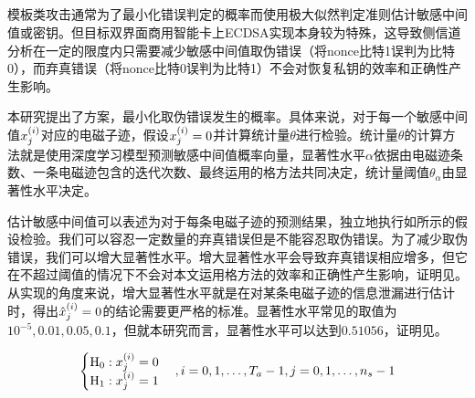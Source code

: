 {{	\subsection{\jiashejianyanguji}

	模板类攻击通常为了最小化错误判定的概率而使用极大似然判定准则估计敏感中间值或密钥。但目标双界面商用智能卡上ECDSA实现本身较为特殊，这导致侧信道分析在一定的限度内只需要减少敏感中间值取伪错误（将nonce比特1误判为比特0），而弃真错误（将nonce比特0误判为比特1）不会对恢复私钥的效率和正确性产生影响。
	
	本研究提出了\jiashejianyanguji 方案，最小化取伪错误发生的概率。具体来说，对于每一个敏感中间值$x^{(i)}_j$对应的电磁子迹，假设$x^{(i)}_j=0$并计算统计量$\theta$进行检验。统计量$\theta$的计算方法就是使用深度学习模型预测敏感中间值概率向量，显著性水平$\alpha$依据由电磁迹条数、一条电磁迹包含的迭代次数、最终运用的格方法共同决定，统计量阈值$\theta_{\alpha}$由显著性水平决定。
	
	
	估计敏感中间值可以表述为对于每条电磁子迹的预测结果，独立地执行如所示的假设检验。我们可以容忍一定数量的弃真错误但是不能容忍取伪错误。为了减少取伪错误，我们可以增大显著性水平。增大显著性水平会导致弃真错误相应增多，但它在不超过阈值的情况下不会对本文运用格方法的效率和正确性产生影响，证明见。从实现的角度来说，增大显著性水平就是在对某条电磁子迹的信息泄漏进行估计时，得出$\hat{x}^{(i)}_j=0$的结论需要更严格的标准。显著性水平常见的取值为$10^{-5},0.01,0.05,0.1$，但就本研究而言，显著性水平可以达到$0.51056$，证明见。
	
	\begin{equation}
		\begin{cases}
			\mathrm H_0:x^{(i)}_j=0\\
			\mathrm H_{1}:x^{(i)}_j=1
		\end{cases},i=0,1,\dots,T_a-1,j=0,1,\dots,n_s-1
		\label{eq:determindewhich}
	\end{equation}
	
}}
